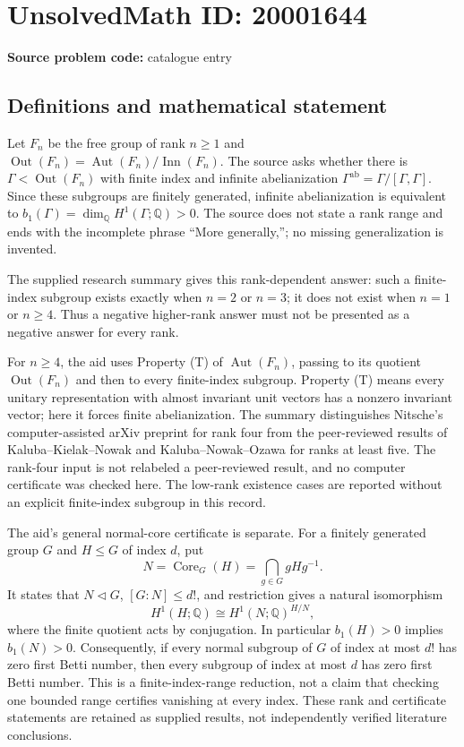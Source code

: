 \documentclass[11pt]{article}
\newcommand{\Q}{\mathbb{Q}}
\begin{document}
\section*{UnsolvedMath ID: 20001644}
\textbf{Source problem code:} catalogue entry
\subsection{Definitions and mathematical statement}
Let $F_n$ be the free group of rank $n\geq1$ and $\operatorname{Out}(F_n)=\operatorname{Aut}(F_n)/\operatorname{Inn}(F_n)$. The source asks whether there is $\Gamma<\operatorname{Out}(F_n)$ with finite index and infinite abelianization $\Gamma^{\mathrm{ab}}=\Gamma/[\Gamma,\Gamma]$. Since these subgroups are finitely generated, infinite abelianization is equivalent to $b_1(\Gamma)=\dim_\Q H^1(\Gamma;\Q)>0$. The source does not state a rank range and ends with the incomplete phrase ``More generally,''; no missing generalization is invented.

The supplied research summary gives this rank-dependent answer: such a finite-index subgroup exists exactly when $n=2$ or $n=3$; it does not exist when $n=1$ or $n\geq4$. Thus a negative higher-rank answer must not be presented as a negative answer for every rank.

For $n\geq4$, the aid uses Property (T) of $\operatorname{Aut}(F_n)$, passing to its quotient $\operatorname{Out}(F_n)$ and then to every finite-index subgroup. Property (T) means every unitary representation with almost invariant unit vectors has a nonzero invariant vector; here it forces finite abelianization. The summary distinguishes Nitsche's computer-assisted arXiv preprint for rank four from the peer-reviewed results of Kaluba--Kielak--Nowak and Kaluba--Nowak--Ozawa for ranks at least five. The rank-four input is not relabeled a peer-reviewed result, and no computer certificate was checked here. The low-rank existence cases are reported without an explicit finite-index subgroup in this record.

The aid's general normal-core certificate is separate. For a finitely generated group $G$ and $H\leq G$ of index $d$, put
\[
 N=\operatorname{Core}_G(H)=\bigcap_{g\in G}gHg^{-1}.
\]
It states that $N\triangleleft G$, $[G:N]\leq d!$, and restriction gives a natural isomorphism
\[
 H^1(H;\Q)\cong H^1(N;\Q)^{H/N},
\]
where the finite quotient acts by conjugation. In particular $b_1(H)>0$ implies $b_1(N)>0$. Consequently, if every normal subgroup of $G$ of index at most $d!$ has zero first Betti number, then every subgroup of index at most $d$ has zero first Betti number. This is a finite-index-range reduction, not a claim that checking one bounded range certifies vanishing at every index. These rank and certificate statements are retained as supplied results, not independently verified literature conclusions.
\end{document}

